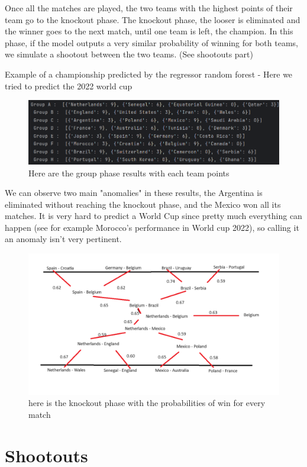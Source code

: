 Once all the matches are played, the two teams with the highest points of their team go to the knockout phase. 
The knockout phase, the looser is eliminated and the winner goes to the next match, until one team is left, the champion.
In this phase, if the model outputs a very similar probability of winning for both teams, we simulate a shootout between the two teams. (See shootouts part)

Example of a championship predicted by the regressor random forest -
Here we tried to predict the 2022 world cup
\begin{figure}[h]
  \centering
  \includegraphics[width=0.8\linewidth]{cdmGroupPhase.png}
  \caption{Here are the group phase results with each team points}
\end{figure}

We can observe two main "anomalies" in these results, the Argentina is eliminated without reaching the knockout phase, and the Mexico won all its matches.
It is very hard to predict a World Cup since pretty much everything can happen (see for example Morocco's performance in World cup 2022), so calling it an anomaly isn't very pertinent.

\begin{figure}[h]
  \centering
  \includegraphics[width=0.8\linewidth]{championshipPaint.png}
  \caption{here is the knockout phase with the probabilities of win for every match}
\end{figure}

\newpage
\section{Shootouts}


